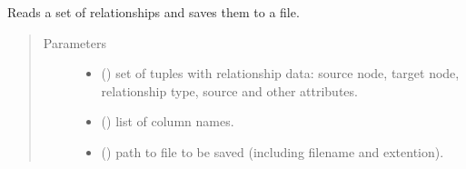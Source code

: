 \documentclass[letterpaper,10pt,english]{sphinxmanual}
\begin{document}
\begin{fulllineitems}
\label{\detokenize{_autosummary/graphdb_builder:graphdb_builder.builder_utils.write_relationships}}
Reads a set of relationships and saves them to a file.
\begin{quote}\begin{description}
\item[{Parameters}] \leavevmode\begin{itemize}
\item {} 
 () \textendash{} set of tuples with relationship data: source node, target node,                                 relationship type, source and other attributes.

\item {} 
 () \textendash{} list of column names.

\item {} 
 () \textendash{} path to file to be saved (including filename and extention).

\end{itemize}

\end{description}\end{quote}

\end{fulllineitems}

\end{document}
